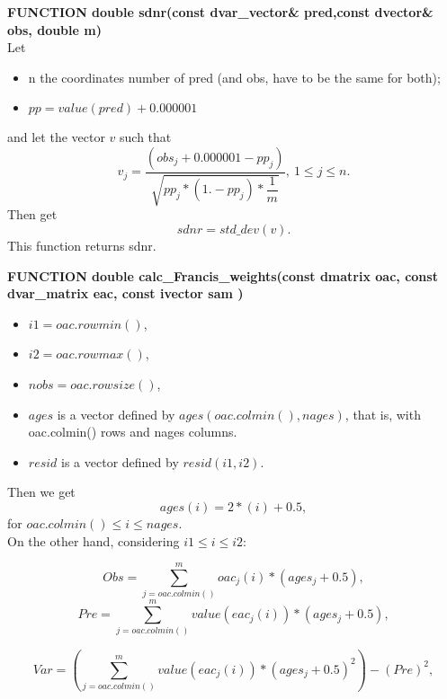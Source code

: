 \documentclass{article}
\begin{document}
\textbf{FUNCTION double sdnr(const dvar\_vector\& pred,const dvector\& obs, double m)}\\
Let
\begin{itemize}
    \item n the coordinates number of pred (and obs, have to be the same for both);
    \item $pp = value(pred)+0.000001$
\end{itemize}
and let the vector $v$ such that
\begin{equation}
    v_j=\dfrac{(obs_j+0.000001-pp_j)}{\sqrt{pp_j*(1.-pp_j)*\dfrac{1}{m}}}, \ 1\leq j \leq n.
\end{equation}
Then get
\begin{equation}
    sdnr = std\_dev\left(v\right).
\end{equation}
This function returns sdnr.



\textbf{FUNCTION double calc\_Francis\_weights(const dmatrix oac, const dvar\_matrix eac, const ivector sam )}\\
\begin{itemize}
    \item $i1=oac.rowmin()$,
    \item $i2=oac.rowmax()$,
    \item $nobs = oac.rowsize()$,
    \item $ages$ is a vector defined by $ages(oac.colmin(),nages)$, that is, with oac.colmin() rows and nages columns.
    \item $resid$ is a vector defined by $resid(i1,i2)$.
\end{itemize}
Then we get
\begin{equation}
    ages(i) = 2*(i) + 0.5,
\end{equation}
for  $oac.colmin() \leq i \leq nages$.\\

On the other hand, considering $i1\leq i \leq i2$:

\begin{equation}
    Obs = \sum_{j=oac.colmin()}^{m}oac_j(i) * (ages_j+0.5),
\end{equation}
\begin{equation}
    Pre = \sum_{j=oac.colmin()}^m value(eac_j(i)) * (ages_j+ 0.5),
\end{equation}

\begin{equation}
    Var = \left(\sum_{j=oac.colmin()}^mvalue(eac_j(i)) * (ages_j+0.5)^2\right) - (Pre)^2,
\end{equation}
\end{document}
